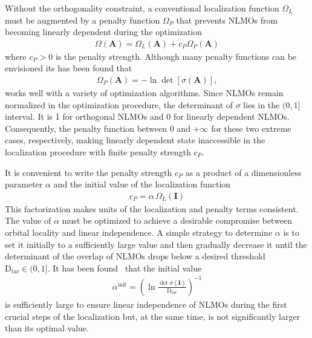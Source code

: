 \documentclass[aps,prl,reprint,amsmath,amssymb]{revtex4-1}
\begin{document}
Without the orthogonality constraint, a conventional localization function $\Omega_L$ must be augmented by a penalty function $\Omega_P$ that prevents NLMOs from becoming linearly dependent during the optimization~\cite{luo2020direct}
%
\begin{equation} \label{eq:fun-overall}
\begin{split}
\Omega(\mathbf{A}) = \Omega_L(\mathbf{A}) + c_P \Omega_P(\mathbf{A})
\end{split}
\end{equation}
%
where $c_P > 0$ is the penalty strength. Although many penalty functions can be envisioned its has been found that
%
\begin{equation} \label{eq:fun-pen}
\begin{split}
\Omega_P(\mathbf{A}) = - \ln \det \left[ \sigma (\mathbf{A}) \right],
\end{split}
\end{equation}
%
works well with a variety of optimization algorithms. %
%
Since NLMOs remain normalized in the optimization procedure, the determinant of $\sigma$ lies in the $(0,1]$ interval. It is 1 for orthogonal NLMOs and 0 for linearly dependent NLMOs. Consequently, the penalty function between 0 and $+\infty$ for these two extreme cases, respectively, making linearly dependent state inaccessible in the localization procedure with finite penalty strength $c_P$. 

It is convenient to write the penalty strength $c_P$ as a product of a dimensionless parameter $\alpha$ and the initial value of the localization function 
%
\begin{equation} \label{eq:cp-beta}
\begin{split} 
c_P = \alpha \, \Omega_L(\mathbf{I})
\end{split}
\end{equation}
%
This factorization makes units of the localization and penalty terms consistent. The value of $\alpha$ must be optimized to achieve a desirable compromise between orbital locality and linear independence. A simple strategy to determine $\alpha$ is to set it initially to a sufficiently large value and then gradually decrease it until the determinant of the overlap of NLMOs drops below a desired threshold $\text{D}_{\text{tar}} \in (0,1]$. It has been found~\cite{luo2020direct} that the initial value 
%
\begin{equation} \label{eq:alpha-init}
\begin{split} 
\alpha^{\text{init}}= \left(\ln\frac{\det\sigma(\mathbf{I})}{\text{D}_{\text{tar}}}\right)^{-1}
\end{split}
\end{equation}
%
is sufficiently large to ensure linear independence of NLMOs during the first crucial steps of the localization but, at the same time, is not significantly larger than its optimal value.
\end{document}
